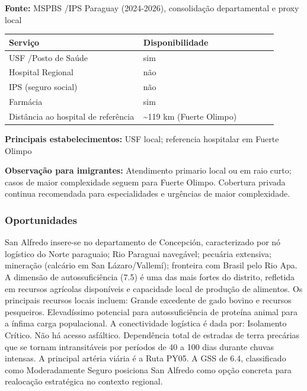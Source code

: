 \textbf{Fonte:} MSPBS /\allowbreak \allowbreak  IPS Paraguay (2024-2026), consolidação
departamental e proxy local

{\def\LTcaptype{none} %
\begin{longtable}{@{}>{\raggedright\arraybackslash}p{0.45\linewidth} >{\raggedright\arraybackslash}p{0.45\linewidth}@{}}
\toprule\noalign{}
Serviço & Disponibilidade \\
\midrule\noalign{}
\endhead
\bottomrule\noalign{}
\endlastfoot
USF /\allowbreak \allowbreak  Posto de Saúde & sim \\
Hospital Regional & não \\
IPS (seguro social) & não \\
Farmácia & sim \\
Distância ao hospital de referência & \textasciitilde119 km (Fuerte
Olimpo) \\
\end{longtable}
}

\textbf{Principais estabelecimentos:} USF local; referencia hospitalar
em Fuerte Olimpo

\textbf{Observação para imigrantes:} Atendimento primario local ou em
raio curto; casos de maior complexidade seguem para Fuerte Olimpo.
Cobertura privada continua recomendada para especialidades e urgências
de maior complexidade.
\newpage

\subsubsection*{Oportunidades}\label{oport-san-alfredo-0110}
San Alfredo insere-se no departamento de Concepción, caracterizado por nó logístico do Norte paraguaio; Rio Paraguai navegável; pecuária extensiva; mineração (calcário em San Lázaro/Vallemí); fronteira com Brasil pelo Rio Apa. A dimensão de autossuficiência (7.5) é uma das mais fortes do distrito, refletida em recursos agrícolas disponíveis e capacidade local de produção de alimentos. Os principais recursos locais incluem: Grande excedente de gado bovino e recursos pesqueiros. Elevadíssimo potencial para autossuficiência de proteína animal para a ínfima carga populacional. A conectividade logística é dada por: Isolamento Crítico. Não há acesso asfáltico. Dependência total de estradas de terra precárias que se tornam intransitáveis por períodos de 40 a 100 dias durante chuvas intensas. A principal artéria viária é a Ruta PY05. A GSS de 6.4, classificado como Moderadamente Seguro posiciona San Alfredo como opção concreta para realocação estratégica no contexto regional.

